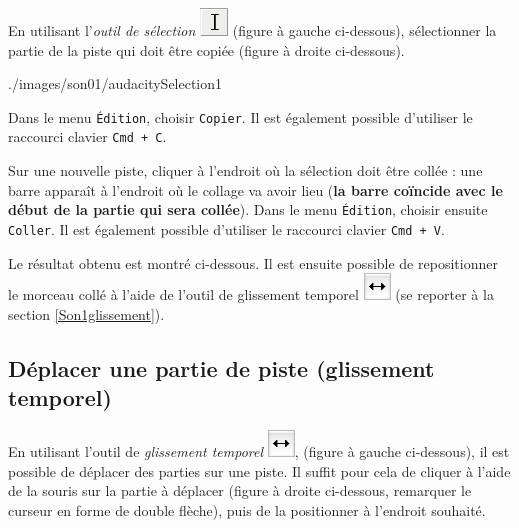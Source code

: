 En utilisant l'\emph{outil de sélection} \includegraphics[width=.5cm]{./images/son01/audacityIconeSelection} (figure à gauche ci-dessous), sélectionner la partie de la piste qui doit être copiée (figure à droite ci-dessous).

                {./images/son01/audacitySelection1}{\textwidth}


Dans le menu \texttt{Édition}, choisir \texttt{Copier}. Il est également possible d'utiliser le raccourci clavier \texttt{Cmd + C}.   


Sur une nouvelle piste, cliquer à l'endroit où la sélection doit être collée : une barre apparaît à l'endroit où le collage va avoir lieu (\textbf{la barre coïncide avec le début de la partie qui sera collée}). Dans le menu \texttt{Édition}, choisir ensuite \texttt{Coller}. Il est également possible d'utiliser le raccourci clavier \texttt{Cmd + V}.  


Le résultat obtenu est montré ci-dessous. Il est ensuite possible de repositionner le morceau collé à l'aide de l'outil de glissement temporel \includegraphics[width=.5cm]{./images/son01/audacityIconeGlissement} (se reporter à la section \vref{Son1glissement}). 



\subsection{Déplacer une partie de piste (glissement temporel)}\label{Son1glissement} 

En utilisant l'outil de \emph{glissement temporel} \includegraphics[width=.5cm]{./images/son01/audacityIconeGlissement}, (figure à gauche ci-dessous), il est possible de déplacer des parties sur une piste. Il suffit pour cela de cliquer à l'aide de la souris sur la partie à déplacer (figure à droite ci-dessous, remarquer le curseur en forme de double flèche), puis de la positionner à l'endroit souhaité.

